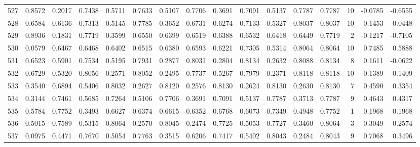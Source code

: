 \begin{tabular}{lrrrrrrrrrrrrrrr}
527 &      0.8572 &  0.2017 &  0.7438 &  0.5711 &  0.7633 &  0.5107 &  0.7706 &  0.3691 &  0.7091 &  0.5137 &   0.7787 &     0.7787 &     10 &                   -0.0785 &                    -0.6555 \\
528 &      0.6584 &  0.6136 &  0.7313 &  0.5145 &  0.7785 &  0.3652 &  0.6731 &  0.6274 &  0.7133 &  0.5327 &   0.8037 &     0.8037 &     10 &                    0.1453 &                    -0.0448 \\
529 &      0.8936 &  0.1831 &  0.7719 &  0.3599 &  0.6550 &  0.6399 &  0.6519 &  0.6388 &  0.6532 &  0.6418 &   0.6449 &     0.7719 &      2 &                   -0.1217 &                    -0.7105 \\
530 &      0.0579 &  0.6467 &  0.6468 &  0.6402 &  0.6515 &  0.6380 &  0.6593 &  0.6221 &  0.7305 &  0.5314 &   0.8064 &     0.8064 &     10 &                    0.7485 &                     0.5888 \\
531 &      0.6523 &  0.5901 &  0.7534 &  0.5195 &  0.7931 &  0.2877 &  0.8031 &  0.2804 &  0.8134 &  0.2632 &   0.8088 &     0.8134 &      8 &                    0.1611 &                    -0.0622 \\
532 &      0.6729 &  0.5320 &  0.8056 &  0.2571 &  0.8052 &  0.2495 &  0.7737 &  0.5267 &  0.7979 &  0.2371 &   0.8118 &     0.8118 &     10 &                    0.1389 &                    -0.1409 \\
533 &      0.3540 &  0.6894 &  0.5406 &  0.8032 &  0.2627 &  0.8120 &  0.2576 &  0.8130 &  0.2624 &  0.8130 &   0.2630 &     0.8130 &      7 &                    0.4590 &                     0.3354 \\
534 &      0.3144 &  0.7461 &  0.5685 &  0.7264 &  0.5106 &  0.7706 &  0.3691 &  0.7091 &  0.5137 &  0.7787 &   0.3713 &     0.7787 &      9 &                    0.4643 &                     0.4317 \\
535 &      0.5784 &  0.7752 &  0.3493 &  0.6627 &  0.6374 &  0.6615 &  0.6352 &  0.6768 &  0.6073 &  0.7349 &   0.4948 &     0.7752 &      1 &                    0.1968 &                     0.1968 \\
536 &      0.5015 &  0.7589 &  0.5315 &  0.8064 &  0.2570 &  0.8045 &  0.2474 &  0.7725 &  0.5053 &  0.7727 &   0.3460 &     0.8064 &      3 &                    0.3049 &                     0.2574 \\
537 &      0.0975 &  0.4471 &  0.7670 &  0.5054 &  0.7763 &  0.3515 &  0.6206 &  0.7417 &  0.5402 &  0.8043 &   0.2484 &     0.8043 &      9 &                    0.7068 &                     0.3496 \\

\end{tabular}
